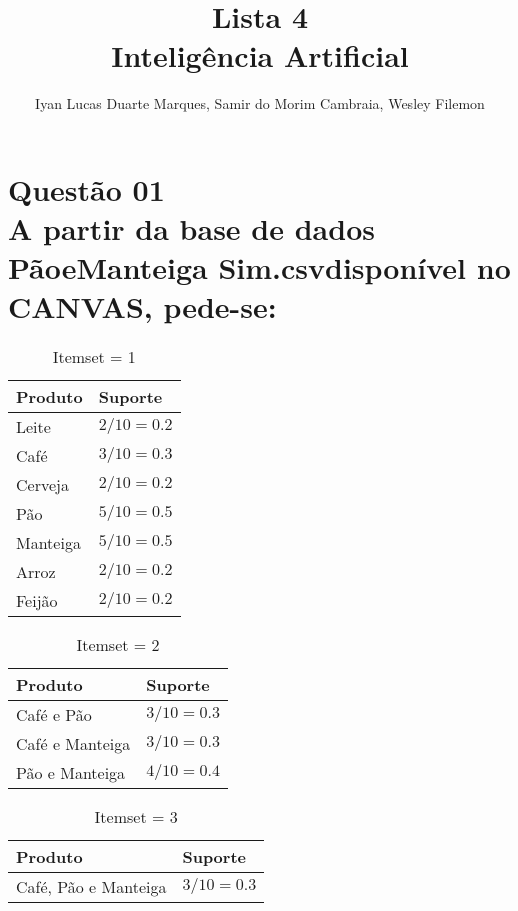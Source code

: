\documentclass[12pt]{article}
\title{Lista 4\\ Inteligência Artificial}
\author{Iyan Lucas Duarte Marques\inst{1}, Samir do Morim Cambraia\inst{1}, Wesley Filemon\inst{1}}
\begin{document}
\maketitle

\section{Questão 01\\
  A partir da base de dados PãoeManteiga Sim.csvdisponível no CANVAS, pede-se:
 }
\begin{table}[h]
	\begin{center}

		\begin{tabular}{| l | l |}
			\hline
			\textbf{Produto} & \textbf{Suporte} \\ \hline
			Leite            & $2/10=0.2$       \\ \hline
			Café             & $3/10=0.3$       \\ \hline
			Cerveja          & $2/10=0.2$       \\ \hline
			Pão              & $5/10=0.5$       \\ \hline
			Manteiga         & $5/10=0.5$       \\ \hline
			Arroz            & $2/10=0.2$       \\ \hline
			Feijão           & $2/10=0.2$       \\ \hline
		\end{tabular}
		\caption{\label{tab:itemset1.1}Itemset = 1}
	\end{center}
\end{table}

\begin{table}[h]
	\begin{center}

		\begin{tabular}{| l | l |}
			\hline
			\textbf{Produto} & \textbf{Suporte} \\ \hline
			Café e Pão       & $3/10=0.3$       \\ \hline
			Café e Manteiga  & $3/10=0.3$       \\ \hline
			Pão e Manteiga   & $4/10=0.4$       \\ \hline
		\end{tabular}
		\caption{\label{tab:itemset1.2}Itemset = 2}
	\end{center}
\end{table}

\begin{table}[h]
	\begin{center}

		\begin{tabular}{| l | l |}
			\hline
			\textbf{Produto}     & \textbf{Suporte} \\ \hline
			Café, Pão e Manteiga & $3/10=0.3$       \\ \hline
		\end{tabular}
		\caption{\label{tab:itemset1.3}Itemset = 3}
	\end{center}
\end{table}
\end{document}
